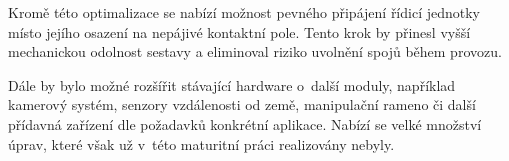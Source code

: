 \documentclass[12pt]{report}
\begin{document}
Kromě této optimalizace se nabízí možnost pevného připájení řídicí jednotky místo jejího osazení na nepájivé kontaktní pole. Tento krok by přinesl vyšší mechanickou odolnost sestavy a eliminoval riziko uvolnění spojů během provozu.

Dále by bylo možné rozšířit stávající hardware o~další moduly, například kamerový systém, senzory vzdálenosti od země, manipulační rameno či další přídavná zařízení dle požadavků konkrétní aplikace. Nabízí se velké množství úprav, které však už v~této maturitní práci realizovány nebyly.

\nocite{*}
\printbibliography					%
\printglossary[title={Zkratky}]		%
\listoffigures						%

\end{document}
